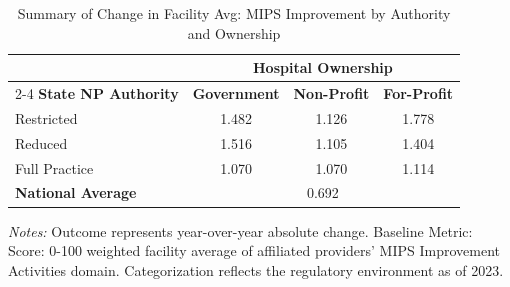 \begin{table}[htbp]
    \centering
    \caption{Summary of Change in Facility Avg: MIPS Improvement by Authority and Ownership}
    \label{tab:d_mips_ia_score_own}
    \vspace{0.2cm}
    \begin{tabular}{lccc}
        \toprule
        & \multicolumn{3}{c}{\textbf{Hospital Ownership}} \\
        \cmidrule(lr){2-4}
        \textbf{State NP Authority} & \textbf{Government} & \textbf{Non-Profit} & \textbf{For-Profit} \\
        \midrule
        Restricted & 1.482 & 1.126 & 1.778 \\
        Reduced & 1.516 & 1.105 & 1.404 \\
        Full Practice & 1.070 & 1.070 & 1.114 \\
        \midrule
        \textbf{National Average} & \multicolumn{3}{c}{0.692} \\
        \bottomrule
    \end{tabular}
    \vspace{0.1cm}
    \begin{minipage}{0.85\textwidth}
        \footnotesize \textit{Notes:} Outcome represents year-over-year absolute change. Baseline Metric: Score: 0-100 weighted facility average of affiliated providers' MIPS Improvement Activities domain. Categorization reflects the regulatory environment as of 2023.
    \end{minipage}
\end{table}